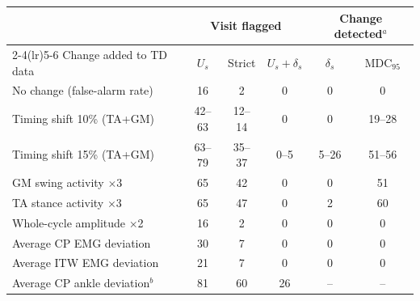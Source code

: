 \begin{tabular}{lccccc}
\toprule
 & \multicolumn{3}{c}{Visit flagged} & \multicolumn{2}{c}{Change detected$^a$} \\
\cmidrule(lr){2-4}\cmidrule(lr){5-6}
Change added to TD data & $U_s$ & Strict & $U_s{+}\delta_s$ & $\delta_s$ & MDC$_{95}$ \\
\midrule
No change (false-alarm rate) & 16 & 2 & 0 & 0 & 0 \\
Timing shift 10\% (TA+GM) & 42--63 & 12--14 & 0 & 0 & 19--28 \\
Timing shift 15\% (TA+GM) & 63--79 & 35--37 & 0--5 & 5--26 & 51--56 \\
GM swing activity $\times$3 & 65 & 42 & 0 & 0 & 51 \\
TA stance activity $\times$3 & 65 & 47 & 0 & 2 & 60 \\
Whole-cycle amplitude $\times$2 & 16 & 2 & 0 & 0 & 0 \\
Average CP EMG deviation & 30 & 7 & 0 & 0 & 0 \\
Average ITW EMG deviation & 21 & 7 & 0 & 0 & 0 \\
Average CP ankle deviation$^b$ & 81 & 60 & 26 & -- & -- \\
\bottomrule
\end{tabular}
